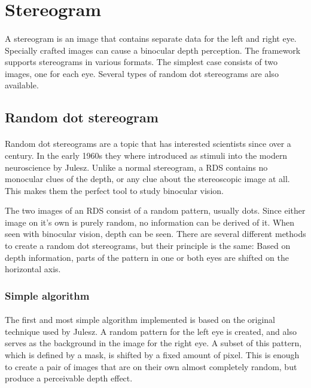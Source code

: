 \section{Stereogram}
\paragraph{}
A stereogram is an image that contains separate data for the left and right eye. Specially crafted images can cause a binocular depth perception. The framework supports stereograms in various formats. The simplest case consists of two images, one for each eye. Several types of random dot stereograms are also available.

\subsection{Random dot stereogram\label{RDS}}
\paragraph{}
Random dot stereograms are a topic that has interested scientists since over a century\cite{AntRDS}. In the early 1960s they where introduced as stimuli into the modern neuroscience by Julesz\cite{BellRDS}. Unlike a normal stereogram, a RDS contains no monocular clues of the depth, or any clue about the stereoscopic image at all. This makes them the perfect tool to study binocular vision.

The two images of an RDS consist of a random pattern, usually dots. Since either image on it's own is purely random, no information can be derived of it. When seen with binocular vision, depth can be seen. There are several different methods to create a random dot stereograms, but their principle is the same:
Based on depth information, parts of the pattern in one or both eyes are shifted on the horizontal axis.

\subsubsection{Simple algorithm}
\paragraph{}
The first and most simple algorithm implemented is based on the original technique used by Julesz\cite{BellRDS}. A random pattern for the left eye is created, and also serves as the background in the image for the right eye. A subset of this pattern, which is defined by a mask, is shifted by a fixed amount of pixel. This is enough to create a pair of images that are on their own almost completely random, but produce a perceivable depth effect.


